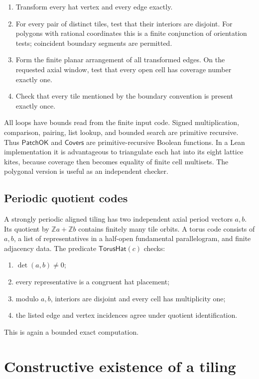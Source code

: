 \documentclass[11pt]{article}
\newcommand{\Z}{\mathbb Z}
\begin{document}
\begin{enumerate}[label=\arabic*.]
\item Transform every hat vertex and every edge exactly.
\item For every pair of distinct tiles, test that their interiors are disjoint.  For
polygons with rational coordinates this is a finite conjunction of orientation tests;
coincident boundary segments are permitted.
\item Form the finite planar arrangement of all transformed edges.  On the requested
axial window, test that every open cell has coverage number exactly one.
\item Check that every tile mentioned by the boundary convention is present exactly
once.
\end{enumerate}

All loops have bounds read from the finite input code.  Signed multiplication, comparison,
pairing, list lookup, and bounded search are primitive recursive.  Thus
$\mathsf{PatchOK}$ and $\mathsf{Covers}$ are primitive-recursive Boolean functions.  In a
Lean implementation it is advantageous to triangulate each hat into its eight lattice
kites, because coverage then becomes equality of finite cell multisets.  The polygonal
version is useful as an independent checker.

\subsection{Periodic quotient codes}
A strongly periodic aligned tiling has two independent axial period vectors $a,b$.  Its
quotient by $\Z a+\Z b$ contains finitely many tile orbits.  A torus code consists of
$a,b$, a list of representatives in a half-open fundamental parallelogram, and finite
adjacency data.  The predicate $\mathsf{TorusHat}(c)$ checks:
\begin{enumerate}[label=(\alph*)]
\item $\det(a,b)\ne0$;
\item every representative is a congruent hat placement;
\item modulo $a,b$, interiors are disjoint and every cell has multiplicity one;
\item the listed edge and vertex incidences agree under quotient identification.
\end{enumerate}
This is again a bounded exact computation.

\section{Constructive existence of a tiling}\label{sec:existence}
\end{document}
